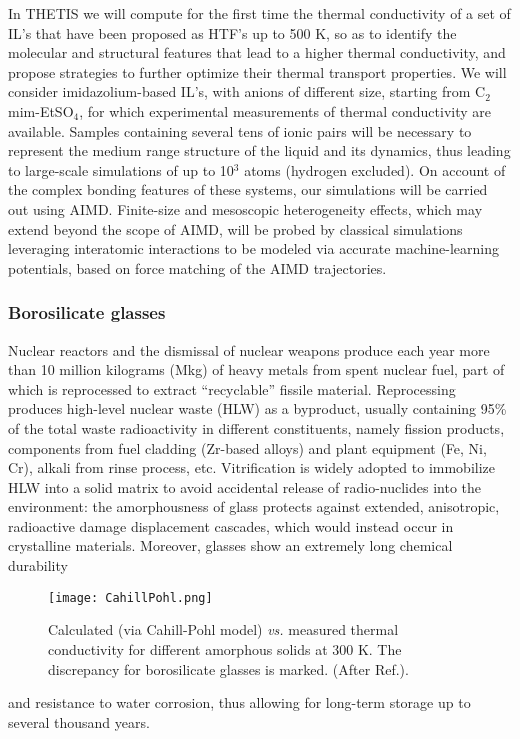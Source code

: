In THETIS we will compute for the first time the thermal conductivity of a set of IL's that have been proposed as HTF's up to 500 K, so as to identify the molecular and structural features that lead to a higher thermal conductivity, and propose strategies to further optimize their thermal transport properties. We will consider imidazolium-based IL's, with anions of different size, starting from C$_2$mim-EtSO$_4$, for which experimental measurements of thermal conductivity are available.\cite{Chen:2014fl} Samples containing several tens of ionic pairs will be necessary to represent the medium range structure of the liquid and its dynamics, thus leading to large-scale simulations of up to 10$^3$ atoms (hydrogen excluded). On account of the complex bonding features of these systems, our simulations will be carried out using AIMD. Finite-size and mesoscopic heterogeneity effects, which may extend beyond the scope of AIMD, will be probed by classical simulations leveraging interatomic interactions to be modeled via accurate machine-learning potentials, based on force matching of the AIMD trajectories.\cite{Izvekov:2004ur,Fritsch:2014hh}

\subsubsection{Borosilicate glasses}
Nuclear reactors %
and the dismissal of nuclear weapons produce each year more than 10 million kilograms (Mkg) of heavy metals from spent nuclear fuel, part of which is reprocessed to extract ``recyclable'' fissile material.\cite{EwingNATURE15,IPFM11} Reprocessing produces high-level nuclear waste (HLW) as a byproduct, usually containing 95\% of the total waste radioactivity in different constituents, namely fission products, components from fuel cladding (Zr-based alloys) and plant equipment (Fe, Ni, Cr), alkali from rinse process, etc. Vitrification is widely adopted to immobilize HLW into a solid matrix to avoid accidental release of radio-nuclides into the environment: the amorphousness of glass protects against extended, anisotropic, radioactive damage displacement cascades, which would instead occur in crystalline materials.\cite{OjovanBook13} Moreover, glasses show an extremely long chemical durability
\begin{wrapfigure}{r}{0.4\textwidth}
  \vspace{-2mm}
  \centering
  \texttt{[image: CahillPohl.png]}
  \caption{
  Calculated (via Cahill-Pohl model) \textit{vs.} measured thermal conductivity for different amorphous solids at 300 K. The discrepancy for borosilicate glasses is marked. (After Ref.\cite{KimJNCS17}).  \label{fig:CahillPohl}}
  \vspace{-2mm}
\end{wrapfigure}
and resistance to water corrosion, thus allowing for long-term storage up to several thousand years.

